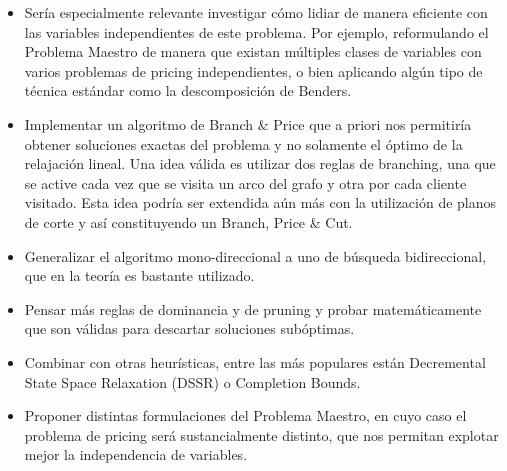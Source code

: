 \begin{itemize}
    \item Sería especialmente relevante investigar cómo lidiar de manera eficiente con las variables independientes de este problema. Por ejemplo, reformulando el Problema Maestro de manera que existan múltiples clases de variables con varios problemas de pricing independientes, o bien aplicando algún tipo de técnica estándar como la descomposición de Benders.  

    \item Implementar un algoritmo de Branch \& Price que a priori nos permitiría obtener soluciones exactas del problema y no solamente el óptimo de la relajación lineal. Una idea válida es utilizar dos reglas de branching, una que se active cada vez que se visita un arco del grafo y otra por cada cliente visitado. Esta idea podría ser extendida aún más con la utilización de planos de corte y así constituyendo un Branch, Price \& Cut.
    
    \item Generalizar el algoritmo mono-direccional a uno de búsqueda bidireccional, que en la teoría es bastante utilizado.

    \item Pensar más reglas de dominancia y de pruning y probar matemáticamente que son válidas para descartar soluciones subóptimas.
        
    \item Combinar con otras heurísticas, entre las más populares están Decremental State Space Relaxation (DSSR) o Completion Bounds. 

    \item Proponer distintas formulaciones del Problema Maestro, en cuyo caso el problema de pricing será sustancialmente distinto, que nos permitan explotar mejor la independencia de variables.
    
\end{itemize}

